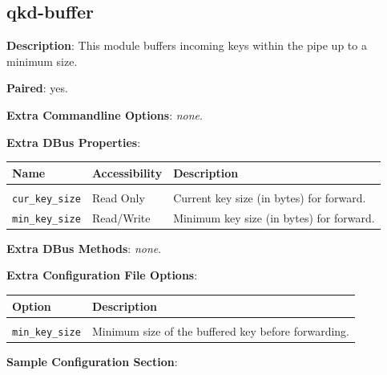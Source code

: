 \clearpage


\subsection{qkd-buffer}
\label{subsec:qkd-buffer}

\textbf{Description}: This module buffers incoming keys within the pipe up to a minimum size.

\bigskip

\noindent \textbf{Paired}: yes.

\bigskip

\noindent \textbf{Extra Commandline Options}: \emph{none}.

\bigskip

\noindent \textbf{Extra DBus Properties}:

\medskip

\begin{tabular}{llp{7cm}}

Name                        & Accessibility &   Description \\
\hline
\\
\texttt{cur\_key\_size}     & Read Only     &   Current key size (in bytes) for forward. \\ [0.5em]
\texttt{min\_key\_size}     & Read/Write    &   Minimum key size (in bytes) for forward. \\ [0.5em]

\end{tabular}

\bigskip

\noindent \textbf{Extra DBus Methods}: \emph{none}.

\bigskip

\noindent \textbf{Extra Configuration File Options}: 

\medskip

\begin{tabular}{lp{9cm}}

Option                      & Description \\
\hline
\\
\texttt{min\_key\_size}     & Minimum size of the buffered key before forwarding. \\ [0.5em]

\end{tabular}

\bigskip

\noindent \textbf{Sample Configuration Section}: 

\medskip

